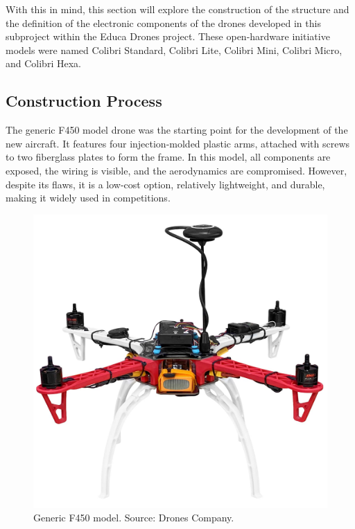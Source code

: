 \documentclass[conference]{IEEEtran}
\begin{document}
With this in mind, this section will explore the construction of the structure and the definition of the electronic components of the drones developed in this subproject within the Educa Drones project. These open-hardware initiative models were named Colibri Standard, Colibri Lite, Colibri Mini, Colibri Micro, and Colibri Hexa.


\subsection{Construction Process}

The generic F450 model drone was the starting point for the development of the new aircraft. It features four injection-molded plastic arms, attached with screws to two fiberglass plates to form the frame. In this model, all components are exposed, the wiring is visible, and the aerodynamics are compromised. However, despite its flaws, it is a low-cost option, relatively lightweight, and durable, making it widely used in competitions.

\begin{figure}[!htb]
    \centering
    \includegraphics[scale=0.07]{img/f450.jpg} 
    \caption{Generic F450 model. Source: Drones Company.}
    \label{fig:F450}
\end{figure}
\end{document}
